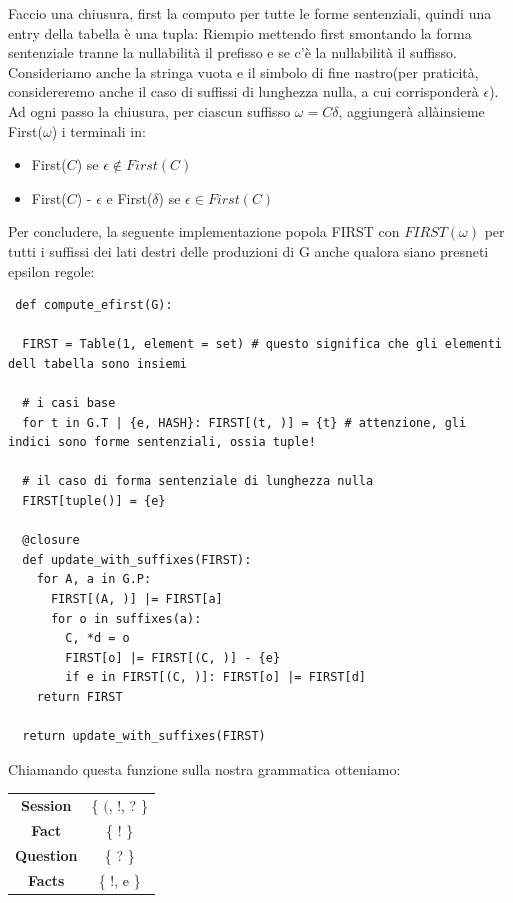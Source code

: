 Faccio una chiusura, first la computo per tutte le forme sentenziali, quindi una entry della tabella è una tupla:
Riempio mettendo first smontando la forma sentenziale tranne la nullabilità il prefisso e se c'è la nullabilità il suffisso. Consideriamo anche la stringa vuota e il simbolo di fine nastro(per praticità, considereremo anche il caso di suffissi di lunghezza nulla, a cui corrisponderà $\epsilon$). Ad ogni passo la chiusura, per ciascun suffisso $\omega = C\delta$, aggiungerà allàinsieme First($\omega$) i terminali in:
\begin{itemize}
  \item First($C$) se $\epsilon \not\in First(C)$
  \item First($C$) - $\epsilon$ e First($\delta$) se $\epsilon \in First(C)$
\end{itemize}
Per concludere, la seguente implementazione popola FIRST con $FIRST(\omega)$ per tutti i suffissi dei lati destri delle produzioni di G anche qualora siano presneti epsilon regole:
\begin{lstlisting}
 def compute_efirst(G):

  FIRST = Table(1, element = set) # questo significa che gli elementi dell tabella sono insiemi

  # i casi base
  for t in G.T | {e, HASH}: FIRST[(t, )] = {t} # attenzione, gli indici sono forme sentenziali, ossia tuple!

  # il caso di forma sentenziale di lunghezza nulla
  FIRST[tuple()] = {e}

  @closure
  def update_with_suffixes(FIRST):
    for A, a in G.P:
      FIRST[(A, )] |= FIRST[a]
      for o in suffixes(a):
        C, *d = o
        FIRST[o] |= FIRST[(C, )] - {e}
        if e in FIRST[(C, )]: FIRST[o] |= FIRST[d]
    return FIRST

  return update_with_suffixes(FIRST) 
\end{lstlisting}

Chiamando questa funzione sulla nostra grammatica otteniamo:
\begin{table}
  \centering
  \begin{tabular}{c|c}
    \textbf{Session} & \{ $($, !, ? \} \\
    \textbf{Fact} & \{ ! \} \\
    \textbf{Question} & \{ ? \} \\
    \textbf{Facts} & \{ !, e \} \\
    
  \end{tabular}
\end{table}